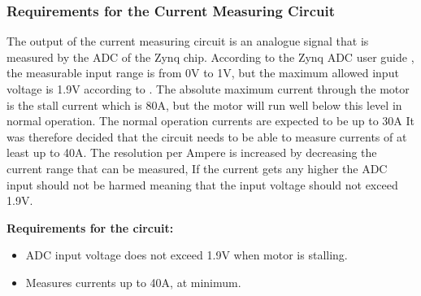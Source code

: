 \subsubsection{Requirements for the Current Measuring Circuit}
The output of the current measuring circuit is an analogue signal that is measured by the ADC of the Zynq chip.
According to the Zynq ADC user guide \cite{zynq_adc}, the measurable input range is from 0V to 1V, but the maximum allowed input voltage is 1.9V according to \cite{adc_zynq_webanswer}.
The absolute maximum current through the motor is the stall current which is 80A, but the motor will run well below this level in normal operation.
The normal operation currents are expected to be up to 30A
It was therefore decided that the circuit  needs to be able to measure currents of at least up to 40A.
The resolution per Ampere is increased by decreasing the current range that can be measured,
If the current gets any higher the ADC input should not be harmed meaning that the input voltage should not exceed 1.9V.

\textbf{Requirements for the circuit:}
\begin{itemize}
	\item ADC input voltage does not exceed 1.9V when motor is stalling.
	\item Measures currents up to 40A, at minimum.
\end{itemize}


